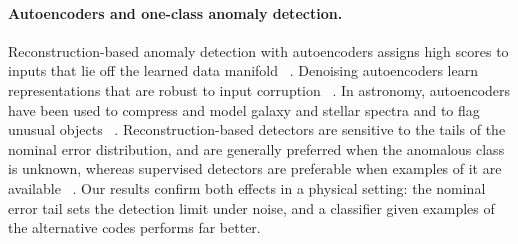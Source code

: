 \paragraph{Autoencoders and one-class anomaly detection.}
Reconstruction-based anomaly detection with autoencoders assigns high scores to inputs that lie off the learned data manifold~\cite{TODO_sakurada_yairi_2014_ae_anomaly,TODO_ruff_2021_unifying_anomaly_review}%
.
Denoising autoencoders learn representations that are robust to input corruption~\cite{TODO_vincent_denoising_ae}%
.
In astronomy, autoencoders have been used to compress and model galaxy and stellar spectra and to flag unusual objects~\cite{TODO_portillo_2020_sdss_vae,TODO_astro_spectra_anomaly_detection}%
.
Reconstruction-based detectors are sensitive to the tails of the nominal error distribution, and are generally preferred when the anomalous class is unknown, whereas supervised detectors are preferable when examples of it are available~\cite{TODO_one_class_vs_supervised_tradeoff}%
.
Our results confirm both effects in a physical setting: the nominal error tail sets the detection limit under noise, and a classifier given examples of the alternative codes performs far better.
